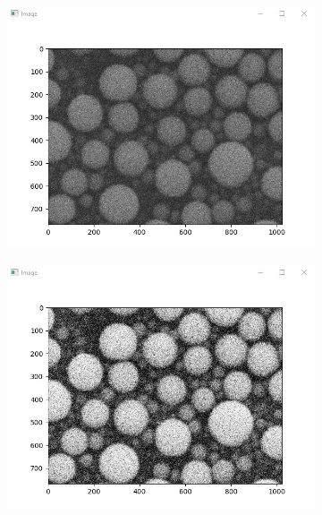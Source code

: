 \documentclass[12pt, twocolumn]{report}
\begin{document}
\begin{figure}[htbp]
    \centering
    \begin{subfigure}{0.45\textwidth}
        \centering
        \includegraphics[width=1\textwidth]{Figures/Software initial image.jpg}
    \end{subfigure}
    \begin{subfigure}{0.45\textwidth}
        \centering
        \includegraphics[width=1\textwidth]{Figures/Software final image.jpg}
    \end{subfigure}
    \begin{subfigure}{0.45\textwidth}
        \centering

\end{subfigure}
\end{figure}
\end{document}
